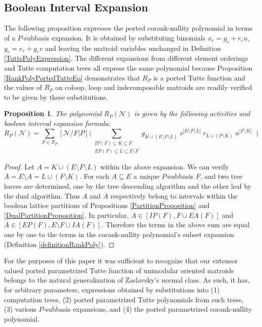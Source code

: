 \documentclass[12pt]{article}
\newtheorem{proposition}[theorem]{Proposition}
\theoremstyle{definition}
\newcommand{\scomp}[1]{\ensuremath{\overline{#1}}}
\newcommand{\Card}[1]{\ensuremath{{\left|#1\right|}}}
\begin{document}
\subsection{Boolean Interval Expansion}

The following proposition 
expresses the ported corank-nullity polynomial
in terms of a $P$-subbasis expansion.  It is obtained by substituting
binomials $x_e=g_e+r_eu$, $y_e=r_e+g_ev$ and leaving
the matroid variables unchanged
in Definition
\ref{TuttePolyExpression}.  The different expansions from
different element orderings and Tutte computation trees all 
express the same polynomial because Proposition
\ref{RankPolyPortedTutteEq} demonstrates that $R_P$ is a ported
Tutte function and the values of $R_P$ on coloop, loop and
indecomposable matroids are readily verified to be given
by these substitutions.  

\begin{proposition}
The polynomial $R_P(\mathcal{N})$ is given
by the following activities and boolean interval expansion formula:
\begin{equation}
R_P(\mathcal{N})=
\sum_{F\in \mathcal{B}_P}[\mathcal{N}/F|P]
\Big(
\sum_{\substack{
       IP(F)\subseteq K \subseteq F\\
       EP(F)\subseteq L \subseteq E\setminus F
      }}
 g_{K\cup (E\setminus F\setminus L)}\;
 v^{\Card{E\setminus F\setminus L}}\;
 r_{L\cup (F\setminus K)}\;
 u^{\Card{F\setminus K}}\;\;
\Big)
\end{equation}
\end{proposition}

\begin{proof}
Let $A=K\cup (E\setminus F\setminus L)$ within the above expansion.
We can verify $\scomp{A}=E\setminus A=L\cup (F\setminus K)$.
For each $A\subseteq E$ a unique $P$-subbasis $F$, and two tree leaves
are determined, one by the tree descending algorithm and the other leaf
by the dual algorithm.  Thus $A$ and $\scomp{A}$ respectively belong
to intervals within the boolean lattice partitions of Propositions
\ref{PartitionProposition} and \ref{DualPartitionProposition}.  In particular, 
$A\in[IP(F),F\cup EA(F)]$ and 
$\scomp{A}\in[EP(F),E\setminus F\cup IA(F)]$.
Therefore the terms in the above sum are equal one by one to the terms in
the corank-nullity polynomial's subset expansion
(Definition \ref{definitionRankPoly}).
\end{proof}



For the purposes of this paper it was sufficient to recognize
that our extensor valued ported parametrized Tutte function of 
unimodular oriented matroids belongs to the natural generalization 
of Zaslavsky's normal class.  As such, it has, for arbitrary
parameters, expressions obtained by substitutions into
(1) computation trees, (2) ported parametrized Tutte polynomials
from such trees, (3) various $P$-subbasis expansions, 
and (4) the ported parametrized corank-nullity polynomial.
\end{document}
